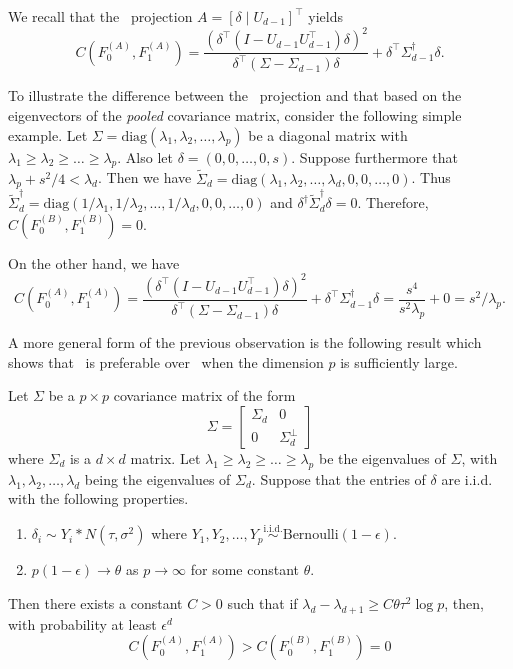 \documentclass[11pt]{extarticle}
\begin{document}
\begin{remark}
We recall that the \Lol~projection $A = [\delta \mid U_{d-1}]^{\top}$ yields
$$ C(F_0^{(A)}, F_1^{(A)}) = \frac{(\delta^{\top} (I - U_{d-1} U_{d-1}^{\top}) \delta)^{2}}{\delta^{\top} (\Sigma - \Sigma_{d-1}) \delta} + \delta^{\top} \Sigma_{d-1}^{\dagger} \delta. $$

To illustrate the difference between the \Lol~projection and that based on the eigenvectors of the {\em pooled} covariance matrix, consider the following simple example. Let $\Sigma = \mathrm{diag}(\lambda_1, \lambda_2, \dots, \lambda_p)$ be a diagonal matrix with $\lambda_1 \geq \lambda_2 \geq \dots \geq \lambda_p$. Also let $\delta = (0,0,\dots,0,s)$. Suppose furthermore that $\lambda_p + s^{2}/4 < \lambda_d$. Then we have $\tilde{\Sigma}_d = \mathrm{diag}(\lambda_1, \lambda_2, \dots, \lambda_d, 0, 0, \dots, 0)$. Thus $\tilde{\Sigma}_d^{\dagger} = \mathrm{diag}(1/\lambda_1, 1/\lambda_2, \dots, 1/\lambda_d, 0,0, \dots, 0)$ and $\delta^{\dagger} \tilde{\Sigma}_d^{\dagger} \delta = 0$. Therefore, $C(F_0^{(B)}, F_1^{(B)}) = 0$.

On the other hand, we have
$$ C(F_0^{(A)}, F_1^{(A)}) = \frac{(\delta^{\top} (I - U_{d-1} U_{d-1}^{\top}) \delta)^{2}}{\delta^{\top} (\Sigma - \Sigma_{d-1}) \delta} + \delta^{\top} \Sigma_{d-1}^{\dagger} \delta = \frac{s^4}{s^2 \lambda_p} + 0 = s^{2}/\lambda_p.$$
\end{remark}
A more general form of the previous observation is the following result which shows that \Lol~is preferable over \Pca~when the dimension $p$ is sufficiently large.
\begin{proposition}
Let $\Sigma$ be a $p \times p$ covariance matrix of the form
$$ \Sigma = \begin{bmatrix} \Sigma_{d} & 0 \\ 0 & \Sigma_{d}^{\perp} \end{bmatrix} $$ where $\Sigma_{d}$ is a $d \times d$ matrix.
Let $\lambda_1 \geq \lambda_2 \geq \dots \geq \lambda_p$ be the eigenvalues of $\Sigma$, with $\lambda_1, \lambda_2, \dots, \lambda_d$ being the eigenvalues of $\Sigma_{d}$. Suppose that the entries of $\delta$ are i.i.d. with the following properties.
\begin{enumerate}
\item $\delta_i \sim Y_i \ast N(\tau, \sigma^2)$ where $Y_1, Y_2, \dots, Y_p \overset{\mathrm{i.i.d.}}{\sim} \mathrm{Bernoulli}(1 - \epsilon)$.
\item $p(1 - \epsilon) \rightarrow \theta$ as $p \rightarrow \infty$ for some constant $\theta$.
\end{enumerate}
Then there exists a constant $C > 0$ such that if $\lambda_d - \lambda_{d+1} \geq C \theta \tau^2 \log p$, then, with probability at least $\epsilon^{d}$
$$ C(F_0^{(A)}, F_1^{(A)}) > C(F_0^{(B)}, F_1^{(B)}) = 0
$$
\end{proposition}
\end{document}
